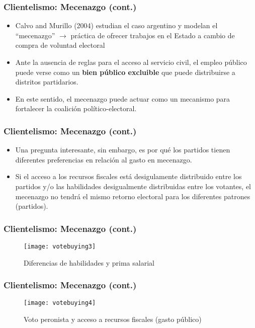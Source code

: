 \documentclass[handout,final,xcolor=dvipsnames]{beamer}
\begin{document}
 
  \begin{frame}\frametitle{Clientelismo: Mecenazgo (cont.)}
  \begin{itemize}\itemsep 10pt
      \item Calvo and Murillo (2004) estudian el caso argentino y
        modelan el ``mecenazgo'' $\longrightarrow$ práctica de ofrecer
        trabajos en el Estado a cambio de compra de voluntad electoral
        \item Ante la ausencia de reglas para el acceso al servicio
          civil, el empleo público puede verse como un \textbf{bien
            público excluible}  que puede distribuirse a distritos
          partidarios.
          \item En este sentido, el mecenazgo puede actuar como un
            mecanismo para fortalecer la coalición
            político-electoral. 
    \end{itemize}
  \end{frame}


  
  \begin{frame}\frametitle{Clientelismo: Mecenazgo (cont.)}
  \begin{itemize}\itemsep 10pt
      \item Una pregunta interesante, sin embargo, es por qué los
        partidos tienen diferentes preferencias en relación al gasto
        en mecenazgo.
        \item Si el acceso a los recursos fiscales está desigulamente
          distribuido entre los partidos y/o las habilidades
          desigualmente distribuidas entre los votantes, el mecenazgo
          no tendrá el mismo retorno electoral para los diferentes
          patrones (partidos).
              \end{itemize}
  \end{frame}
  


 \begin{frame}\frametitle{Clientelismo: Mecenazgo (cont.)}
\begin{figure}[!htbp]
  \centering \vspace{-0.5cm}
 \caption{Diferencias de habilidades y prima salarial}
  \label{fig:lic1}
  \texttt{[image: votebuying3]}
 \end{figure}
\end{frame}



 \begin{frame}\frametitle{Clientelismo: Mecenazgo (cont.)}
\begin{figure}[!htbp]
  \centering \vspace{-0.5cm}
 \caption{Voto peronista y acceso a recursos fiscales (gasto público)}
  \label{fig:lic1}
  \texttt{[image: votebuying4]}
 \end{figure}
\end{frame}
\end{document}
